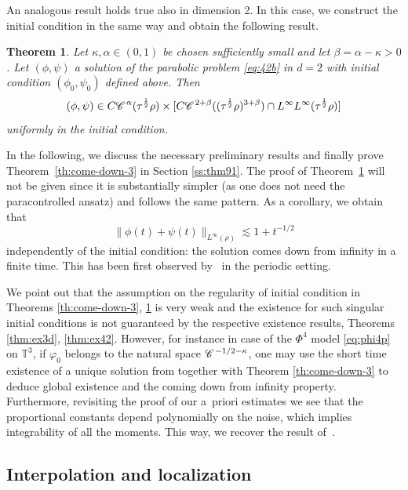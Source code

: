 \documentclass[a4paper,11pt]{article}
\newtheorem{theorem}{Theorem}[section]
\numberwithin{equation}{section}
\newcommand{\CC}{\mathscr{C} \hspace{.1em}}
\newcommand{\8}{\infty}
\begin{document}
An analogous result holds true also in dimension 2. In this case, we construct the initial condition in the same way and obtain the following result.


\begin{theorem}
  \label{th:come-down-2}
  Let $\kappa, \alpha\in (0,1)$ be chosen sufficiently small and let $\beta=\alpha-\kappa>0$. Let $(\phi, \psi)$ a solution of the parabolic problem \eqref{eq:42b}
  in $d = 2$ with initial condition $(\phi_{0},\psi_{0})$ defined above. Then
  \[ (\phi, \psi) \in C \CC^{\alpha} (\tau^{\frac 12} \rho) \times [C \CC^{2
     + \beta} ((\tau^{ \frac 12} \rho)^{3 + \beta}) \cap L^{\infty}
     L^{\infty} (\tau^{\frac 12} \rho)] \]
  uniformly in the initial condition.
\end{theorem}


In the following, we discuss the necessary preliminary results and finally prove Theorem~\ref{th:come-down-3} in Section \ref{ss:thm91}. The proof of
Theorem~\ref{th:come-down-2} will not be given since it is substantially simpler
(as one does not need the paracontrolled ansatz) and follows the same pattern.
As a corollary,  we obtain that
\[ \| \phi (t) + \psi (t) \|_{L^{\infty}(\rho)} \lesssim 1 + t^{- 1 / 2} \]
independently of the initial condition: the solution comes down from infinity in a
finite time. This has been first observed by~\cite{MWcomedown} in the periodic setting.




\begin{remark}
We point out that the assumption on the regularity of initial condition in Theorems \ref{th:come-down-3}, \ref{th:come-down-2} is very weak and the existence for such singular initial conditions is not guaranteed  by the respective existence results, Theorems \ref{thm:ex3d}, \ref{thm:ex42}. However, for instance in case of the $\Phi^{4}$ model  \eqref{eq:phi4p} on $\mathbb{T}^{3}$, if $\varphi_{0}$ belongs to the natural space $\CC^{-1/2-\kappa}$, one may use the short time existence of a unique solution from \cite{CC} together with Theorem \ref{th:come-down-3} to deduce global existence and the coming down from infinity property. Furthermore, revisiting the proof of our a~priori estimates we see that the proportional constants depend polynomially on the noise, which implies integrability of all the moments. This way, we recover the result of~\cite{MWcomedown}.
\end{remark}



\subsection{Interpolation and localization}
\label{ss:d0}
\end{document}
